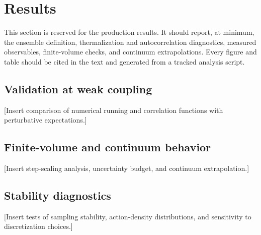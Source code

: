 \section{Results}
\label{sec:results}

This section is reserved for the production results.  It should report, at minimum, the ensemble definition, thermalization and autocorrelation diagnostics, measured observables, finite-volume checks, and continuum extrapolations.  Every figure and table should be cited in the text and generated from a tracked analysis script.

\subsection{Validation at weak coupling}

[Insert comparison of numerical running and correlation functions with perturbative expectations.]

\subsection{Finite-volume and continuum behavior}

[Insert step-scaling analysis, uncertainty budget, and continuum extrapolation.]

\subsection{Stability diagnostics}

[Insert tests of sampling stability, action-density distributions, and sensitivity to discretization choices.]

